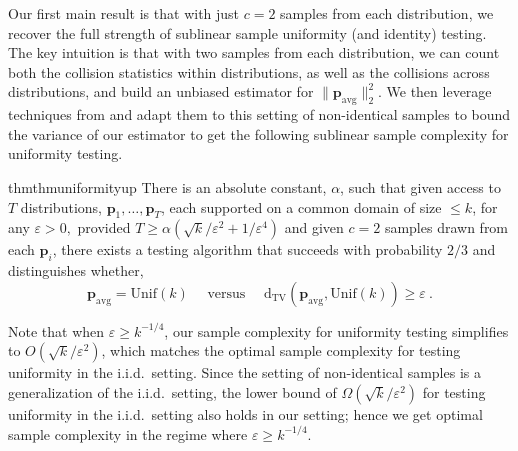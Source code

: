 \documentclass[10pt]{article} %
\def\eps{{\varepsilon}}
\theoremstyle{plain}
\newcommand{\bp}{\textbf{p}}
\newcommand{\unik}{\mathrm{Unif}(k)}%
\newcommand{\dtv}{\mathrm{d_{TV}}}
\newcommand{\avg}{\mathrm{avg}}
\begin{document}
Our first main result is that  with just $c=2$ samples from each distribution, we recover the full strength of sublinear sample uniformity (and identity) testing.  The key intuition is that with two samples from each distribution, we can count both the collision statistics within distributions, as well as the collisions across distributions, and build an unbiased estimator for $\|\bp_{\avg}\|_2^2$. We then leverage techniques from \cite{diakonikolas2016collision} and adapt them to this setting of non-identical samples to bound the variance of our estimator to get the following sublinear sample complexity for uniformity testing. 

\begin{restatable}{thm}{thmuniformityup}
	\label{thm:uniformityup}
	There is an absolute constant, $\alpha$, such that given access to $T$ distributions, $\bp_1,\ldots,\bp_T$, each supported on a common domain of size $\le k$, for any $\eps>0,$ provided $T \ge \alpha(\sqrt{k}/\eps^2+1/\eps^4)$ and given $c=2$ samples drawn from each $\bp_i$,  there exists a testing algorithm that succeeds with probability $2/3$ and distinguishes whether,
	$$\bp_{\avg} = \unik \quad \text{ versus } \quad \dtv(\bp_{\avg},\unik) \geq \eps~.$$
\end{restatable} 
Note that when $\eps \geq k^{-1/4}$, our sample complexity for uniformity testing simplifies to $O(\sqrt{k}/\eps^2)$, which matches the optimal sample complexity for testing uniformity in the i.i.d.\ setting. Since the setting of non-identical samples is a generalization of the i.i.d.\ setting, the lower bound of $\Omega(\sqrt{k}/\eps^2)$ for testing uniformity in the i.i.d.\ setting also holds in our setting; hence we get optimal sample complexity in the regime where $\eps \geq k^{-1/4}$.
\end{document}
